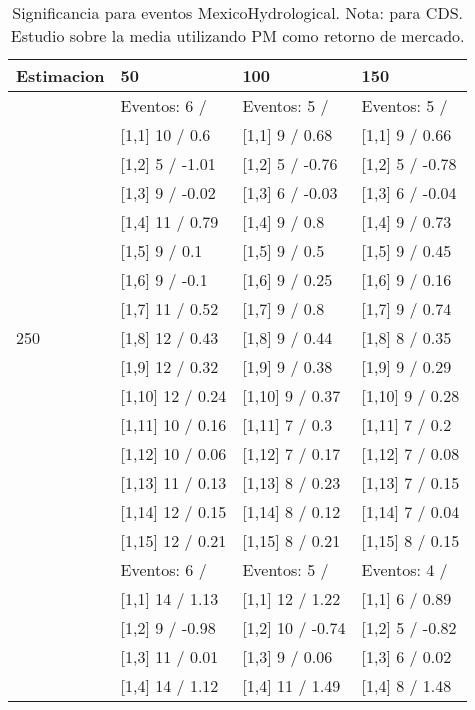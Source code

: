 \begin{table}

\caption{Significancia para eventos MexicoHydrological. Nota: para CDS. Estudio sobre la media utilizando PM como retorno de mercado.}
\centering
\begin{tabular}[t]{llll}
\toprule
Estimacion & 50 & 100 & 150\\
\midrule
 & Eventos:  6 / & Eventos:  5 / & Eventos:  5 /\\
 & {}[1,1] 10  / 0.6 & {}[1,1] 9  / 0.68 & {}[1,1] 9  / 0.66\\
 & {}[1,2] 5  / -1.01 & {}[1,2] 5  / -0.76 & {}[1,2] 5  / -0.78\\
 & {}[1,3] 9  / -0.02 & {}[1,3] 6  / -0.03 & {}[1,3] 6  / -0.04\\
 & {}[1,4] 11  / 0.79 & {}[1,4] 9  / 0.8 & {}[1,4] 9  / 0.73\\
\addlinespace
 & {}[1,5] 9  / 0.1 & {}[1,5] 9  / 0.5 & {}[1,5] 9  / 0.45\\
 & {}[1,6] 9  / -0.1 & {}[1,6] 9  / 0.25 & {}[1,6] 9  / 0.16\\
 & {}[1,7] 11  / 0.52 & {}[1,7] 9  / 0.8 & {}[1,7] 9  / 0.74\\
250 & {}[1,8] 12  / 0.43 & {}[1,8] 9  / 0.44 & {}[1,8] 8  / 0.35\\
 & {}[1,9] 12  / 0.32 & {}[1,9] 9  / 0.38 & {}[1,9] 9  / 0.29\\
\addlinespace
 & {}[1,10] 12  / 0.24 & {}[1,10] 9  / 0.37 & {}[1,10] 9  / 0.28\\
 & {}[1,11] 10  / 0.16 & {}[1,11] 7  / 0.3 & {}[1,11] 7  / 0.2\\
 & {}[1,12] 10  / 0.06 & {}[1,12] 7  / 0.17 & {}[1,12] 7  / 0.08\\
 & {}[1,13] 11  / 0.13 & {}[1,13] 8  / 0.23 & {}[1,13] 7  / 0.15\\
 & {}[1,14] 12  / 0.15 & {}[1,14] 8  / 0.12 & {}[1,14] 7  / 0.04\\
\addlinespace
 & {}[1,15] 12  / 0.21 & {}[1,15] 8  / 0.21 & {}[1,15] 8  / 0.15\\
 & Eventos:  6 / & Eventos:  5 / & Eventos:  4 /\\
 & {}[1,1] 14  / 1.13 & {}[1,1] 12  / 1.22 & {}[1,1] 6  / 0.89\\
 & {}[1,2] 9  / -0.98 & {}[1,2] 10  / -0.74 & {}[1,2] 5  / -0.82\\
 & {}[1,3] 11  / 0.01 & {}[1,3] 9  / 0.06 & {}[1,3] 6  / 0.02\\
\addlinespace
 & {}[1,4] 14  / 1.12 & {}[1,4] 11  / 1.49 & {}[1,4] 8  / 1.48\\

\end{tabular}
\end{table}
